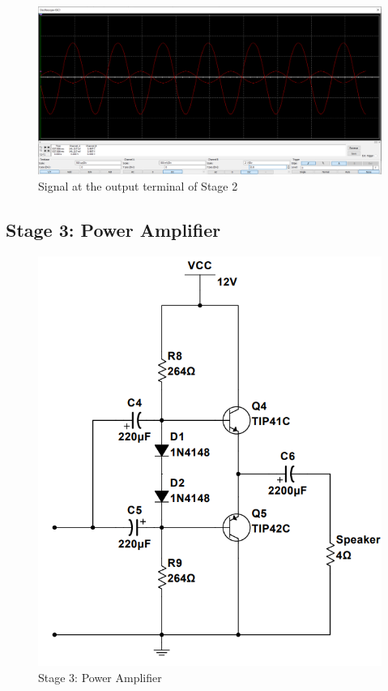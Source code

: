 \documentclass[twoside, a4paper, leqno]{article}
\begin{document}
		\begin{center}
			\begin{figure}[htp]
				\begin{center}
					\includegraphics[scale = .37]{figure/stage2_signal.png}
				\end{center}
				\caption{Signal at the output terminal of Stage 2}
				\label{refFigure7}
			\end{figure}
		\end{center}
		
	\newpage
	\subsection{Stage 3: Power Amplifier}
	\begin{center}
		\begin{figure}[htp]
			\begin{center}
				\includegraphics[scale = .5]{figure/Stage3.png}
			\end{center}
			\caption{Stage 3: Power Amplifier}
			\label{refFigure8}
		\end{figure}
	\end{center}
	
\end{document}
